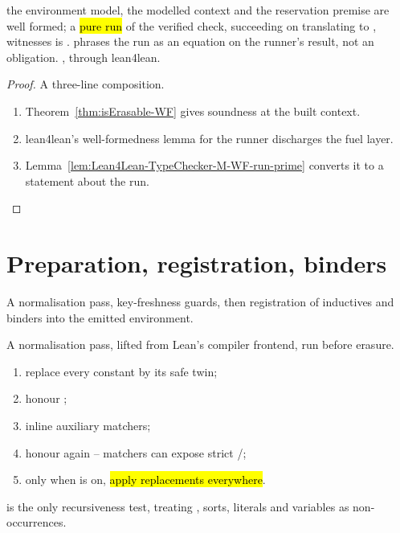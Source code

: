 \begin{theorem}
\label{thm:Oracle-kernel_isErasable_sound}
\leanok
{} the environment model, the modelled context and the reservation premise are well
formed;
 a \hl{pure run} of the verified check, succeeding on  translating to
, witnesses  is \Erasable{}.
 phrases the run as an equation on the runner's result, not an obligation.
 \stProved{}, \stInherited{} through lean4lean.
\end{theorem}
\begin{proof}
\leanok
{}
 A three-line composition.
\begin{enumerate}
\item Theorem~\ref{thm:isErasable-WF} gives soundness at the built context.
\item lean4lean's well-formedness lemma for the runner discharges the fuel layer.
\item Lemma~\ref{lem:Lean4Lean-TypeChecker-M-WF-run-prime} converts it to a statement about the run.
\end{enumerate}
\end{proof}

\section{Preparation, registration, binders}
\label{sec:eraser:prepare}
A normalisation pass, key-freshness guards, then registration of inductives and binders into the
emitted environment.

\begin{definition}
\label{def:Erasure-prepare_erasure}
\leanok
{} A normalisation pass, lifted from Lean's compiler frontend, run before erasure.
\begin{enumerate}
\item replace every  constant by its safe twin;
\item honour ;
\item inline auxiliary matchers;
\item honour  again -- matchers can expose strict /;
\item only when  is on, \hl{apply  replacements everywhere}.
\end{enumerate}
  is the only recursiveness test, treating , sorts,
literals and variables as non-occurrences.
\end{definition}

